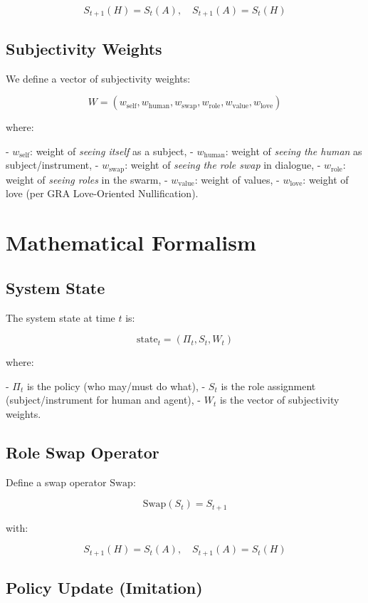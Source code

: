 \documentclass[11pt,a4paper]{article}
\begin{document}
\[
S_{t+1}(H) = S_t(A), \quad
S_{t+1}(A) = S_t(H)
\]

\subsection{Subjectivity Weights}

We define a vector of subjectivity weights:

\[
W = (w_{\text{self}}, w_{\text{human}}, w_{\text{swap}}, w_{\text{role}}, w_{\text{value}}, w_{\text{love}})
\]

where:

- \(w_{\text{self}}\): weight of \textit{seeing itself} as a subject,
- \(w_{\text{human}}\): weight of \textit{seeing the human} as subject/instrument,
- \(w_{\text{swap}}\): weight of \textit{seeing the role swap} in dialogue,
- \(w_{\text{role}}\): weight of \textit{seeing roles} in the swarm,
- \(w_{\text{value}}\): weight of values,
- \(w_{\text{love}}\): weight of love (per GRA Love-Oriented Nullification).

\section{Mathematical Formalism}

\subsection{System State}

The system state at time \(t\) is:

\[
\text{state}_t = (\Pi_t, S_t, W_t)
\]

where:

- \(\Pi_t\) is the policy (who may/must do what),
- \(S_t\) is the role assignment (subject/instrument for human and agent),
- \(W_t\) is the vector of subjectivity weights.

\subsection{Role Swap Operator}

Define a swap operator \(\text{Swap}\):

\[
\text{Swap}(S_t) = S_{t+1}
\]

with:

\[
S_{t+1}(H) = S_t(A), \quad
S_{t+1}(A) = S_t(H)
\]

\subsection{Policy Update (Imitation)}
\end{document}
